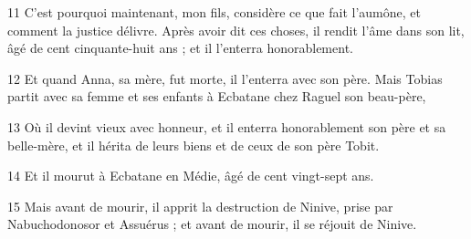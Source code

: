 \par 11 C'est pourquoi maintenant, mon fils, considère ce que fait l'aumône, et comment la justice délivre. Après avoir dit ces choses, il rendit l'âme dans son lit, âgé de cent cinquante-huit ans ; et il l'enterra honorablement.
\par 12 Et quand Anna, sa mère, fut morte, il l'enterra avec son père. Mais Tobias partit avec sa femme et ses enfants à Ecbatane chez Raguel son beau-père,
\par 13 Où il devint vieux avec honneur, et il enterra honorablement son père et sa belle-mère, et il hérita de leurs biens et de ceux de son père Tobit.
\par 14 Et il mourut à Ecbatane en Médie, âgé de cent vingt-sept ans.
\par 15 Mais avant de mourir, il apprit la destruction de Ninive, prise par Nabuchodonosor et Assuérus ; et avant de mourir, il se réjouit de Ninive.

